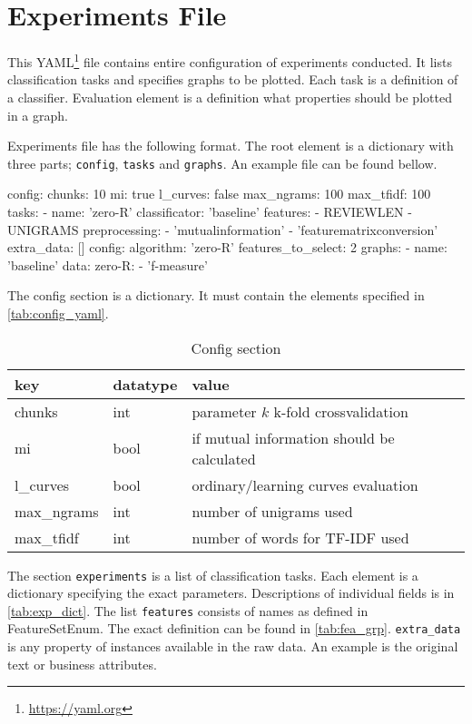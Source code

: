 \section{Experiments File}

This YAML\footnote{\url{https://yaml.org}}  file contains entire configuration of experiments conducted.
It lists classification tasks and specifies graphs to be plotted.
Each task is a definition of a classifier.
Evaluation element is a definition what properties should be plotted in a graph.

Experiments file has the following format.
The root element is a dictionary with three parts;
\texttt{config}, \texttt{tasks} and \texttt{graphs}.
An example file can be found bellow.

\begin{code}
config:
  chunks: 10
  mi: true
  l_curves: false
  max_ngrams: 100
  max_tfidf: 100
tasks:
  - name: 'zero-R'
    classificator: 'baseline'
    features:
      - REVIEWLEN
      - UNIGRAMS
    preprocessing:
      - 'mutualinformation'
      - 'featurematrixconversion'
    extra_data: []
    config:
      algorithm: 'zero-R'
      features_to_select: 2
graphs:
  - name: 'baseline'
    data:
      zero-R:
        - 'f-measure'
\end{code}

The config section is a dictionary.
It must contain the elements specified in \autoref{tab:config_yaml}.

\begin{table}[h]
\centering
\begin{tabular}{lll}
\toprule
\textbf{key} & \textbf{datatype} & \textbf{value} \\
\midrule

chunks & int & parameter $k$  k-fold crossvalidation\\
mi & bool & if mutual information should be calculated\\
l\_curves & bool & ordinary/learning curves evaluation\\
max\_ngrams & int & number of unigrams used \\
max\_tfidf & int & number of words for TF-IDF used\\

\bottomrule
\end{tabular}

\caption{Config section}\label{tab:config_yaml}
\end{table}


The section \texttt{experiments} is a list of classification tasks.
Each element is a dictionary specifying the exact parameters.
Descriptions of individual fields is in \autoref{tab:exp_dict}.
The list \texttt{features} consists of names as defined in FeatureSetEnum.
The exact definition can be found in \autoref{tab:fea_grp}.
\texttt{extra\_data} is any property of instances available in the raw data.
An example is the original text or business attributes.

